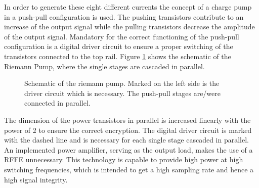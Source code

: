 \documentclass[journal]{IEEEtran}
\begin{document}
%
In order to generate these eight different currents the concept of a charge pump in a push-pull configuration is used.
The pushing transistors contribute to an increase of the output signal while the pulling transistors decrease the amplitude of the output signal.
Mandatory for the correct functioning of the push-pull configuration is a digital driver circuit to ensure a proper switching of the transistors connected to the top rail.
Figure \ref{fig:schematic_multibit_rp} shows the schematic of the Riemann Pump, where the single stages are cascaded in parallel.
%
\begin{figure}[htb]
  \centering
	\begin{scriptsize}
  	\def\svgwidth{\columnwidth}
 	 
  	\caption{Schematic of the riemann pump. Marked on the left side is the driver circuit which is necessary. The push-pull stages are/were connected in parallel.}
  	\label{fig:schematic_multibit_rp}
	\end{scriptsize}
\end{figure}
The dimension of the power transistors in parallel is increased linearly with the power of 2 to ensure the correct encryption.
The digital driver circuit is marked with the dashed line and is necessary for each single stage cascaded in parallel.
An implemented power amplifier, serving as the output load, makes the use of a RFFE unnecessary.
This technology is capable to provide high power at high switching frequencies, which is intended to get a high sampling rate and hence a high signal integrity.
\end{document}
